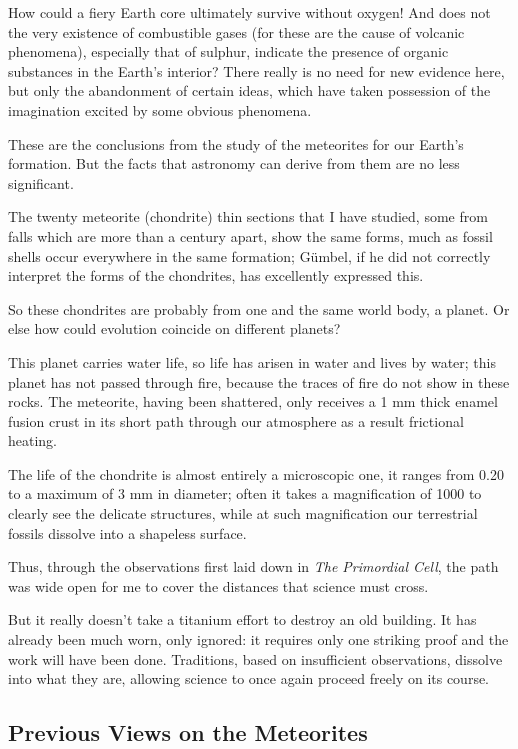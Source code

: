 \documentclass[a4paper, 11pt, oneside]{article}
\begin{document}
How could a fiery Earth core ultimately survive without oxygen! And does not the very existence of combustible gases (for these are the cause of volcanic phenomena), especially that of sulphur, indicate the presence of organic substances in the Earth's interior? There really is no need for new evidence here, but only the abandonment of certain ideas, which have taken possession of the imagination excited by some obvious phenomena.

These are the conclusions from the study of the meteorites for our Earth's formation. But the facts that astronomy can derive from them are no less significant.

The twenty meteorite (chondrite) thin sections that I have studied, some from falls which are more than a century apart, show the same forms, much as fossil shells occur everywhere in the same formation; Gümbel, if he did not correctly interpret the forms of the chondrites, has excellently expressed this.

So these chondrites are probably from one and the same world body, a planet. Or else how could evolution coincide on different planets?

This planet carries water life, so life has arisen in water and lives by water; this planet has not passed through fire, because the traces of fire do not show in these rocks. The meteorite, having been shattered, only receives a 1 mm thick enamel fusion crust in its short path through our atmosphere as a result frictional heating.

The life of the chondrite is almost entirely a microscopic one, it ranges from 0.20 to a maximum of 3 mm in diameter; often it takes a magnification of 1000 to clearly see the delicate structures, while at such magnification our terrestrial fossils dissolve into a shapeless surface.

Thus, through the observations first laid down in \emph{The Primordial Cell}, the path was wide open for me to cover the distances that science must cross.

But it really doesn't take a titanium effort to destroy an old building. It has already been much worn, only ignored: it requires only one striking proof and the work will have been done. Traditions, based on insufficient observations, dissolve into what they are, allowing science to once again proceed freely on its course.
\clearpage
\subsection{Previous Views on the Meteorites}
\end{document}
